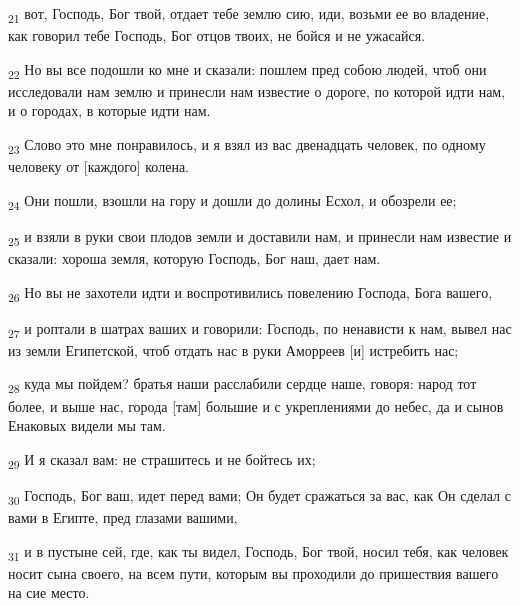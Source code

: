 \begin{tcolorbox}
\textsubscript{21} вот, Господь, Бог твой, отдает тебе землю сию, иди, возьми ее во владение, как говорил тебе Господь, Бог отцов твоих, не бойся и не ужасайся.
\end{tcolorbox}
\begin{tcolorbox}
\textsubscript{22} Но вы все подошли ко мне и сказали: пошлем пред собою людей, чтоб они исследовали нам землю и принесли нам известие о дороге, по которой идти нам, и о городах, в которые идти нам.
\end{tcolorbox}
\begin{tcolorbox}
\textsubscript{23} Слово это мне понравилось, и я взял из вас двенадцать человек, по одному человеку от [каждого] колена.
\end{tcolorbox}
\begin{tcolorbox}
\textsubscript{24} Они пошли, взошли на гору и дошли до долины Есхол, и обозрели ее;
\end{tcolorbox}
\begin{tcolorbox}
\textsubscript{25} и взяли в руки свои плодов земли и доставили нам, и принесли нам известие и сказали: хороша земля, которую Господь, Бог наш, дает нам.
\end{tcolorbox}
\begin{tcolorbox}
\textsubscript{26} Но вы не захотели идти и воспротивились повелению Господа, Бога вашего,
\end{tcolorbox}
\begin{tcolorbox}
\textsubscript{27} и роптали в шатрах ваших и говорили: Господь, по ненависти к нам, вывел нас из земли Египетской, чтоб отдать нас в руки Аморреев [и] истребить нас;
\end{tcolorbox}
\begin{tcolorbox}
\textsubscript{28} куда мы пойдем? братья наши расслабили сердце наше, говоря: народ тот более, и выше нас, города [там] большие и с укреплениями до небес, да и сынов Енаковых видели мы там.
\end{tcolorbox}
\begin{tcolorbox}
\textsubscript{29} И я сказал вам: не страшитесь и не бойтесь их;
\end{tcolorbox}
\begin{tcolorbox}
\textsubscript{30} Господь, Бог ваш, идет перед вами; Он будет сражаться за вас, как Он сделал с вами в Египте, пред глазами вашими,
\end{tcolorbox}
\begin{tcolorbox}
\textsubscript{31} и в пустыне сей, где, как ты видел, Господь, Бог твой, носил тебя, как человек носит сына своего, на всем пути, которым вы проходили до пришествия вашего на сие место.
\end{tcolorbox}
